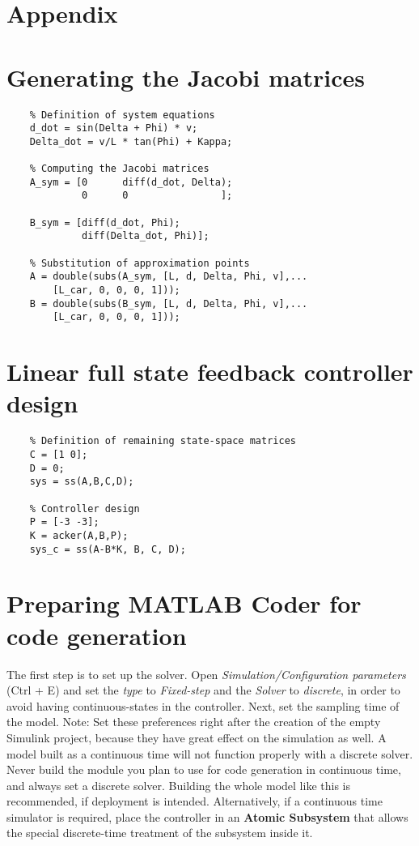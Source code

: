 \section*{Appendix}

\appendix
\section{Generating the Jacobi matrices}
\label{app:jacobi}
\begin{lstlisting}
    % Definition of system equations
    d_dot = sin(Delta + Phi) * v;
    Delta_dot = v/L * tan(Phi) + Kappa;
    
    % Computing the Jacobi matrices
    A_sym = [0      diff(d_dot, Delta);
             0      0                ];
       
    B_sym = [diff(d_dot, Phi);
             diff(Delta_dot, Phi)];
    
    % Substitution of approximation points
    A = double(subs(A_sym, [L, d, Delta, Phi, v],...
        [L_car, 0, 0, 0, 1]));
    B = double(subs(B_sym, [L, d, Delta, Phi, v],...
        [L_car, 0, 0, 0, 1]));
\end{lstlisting}

\section{Linear full state feedback controller design}
\label{app:controller}
\begin{lstlisting}
    % Definition of remaining state-space matrices
    C = [1 0];
    D = 0;
    sys = ss(A,B,C,D);
    
    % Controller design
    P = [-3 -3];
    K = acker(A,B,P);
    sys_c = ss(A-B*K, B, C, D);
\end{lstlisting}

\section{Preparing MATLAB Coder for code generation}
\label{app:rtw}

The first step is to set up the solver. Open \emph{Simulation/Configuration parameters} (Ctrl + E) and set the \emph{type} to \emph{Fixed-step} and the \emph{Solver} to \emph{discrete}, in order to avoid having continuous-states in the controller. Next, set the sampling time of the model.
Note: Set these preferences right after the creation of the empty Simulink project, because they have great effect on the simulation as well. A model built as a continuous time will not function properly with a discrete solver. Never build the module you plan to use for code generation in continuous time, and always set a discrete solver. Building the whole model like this is recommended, if deployment is intended. Alternatively, if a continuous time simulator is required, place the controller in an \textbf{Atomic Subsystem} that allows the special discrete-time treatment of the subsystem inside it.

